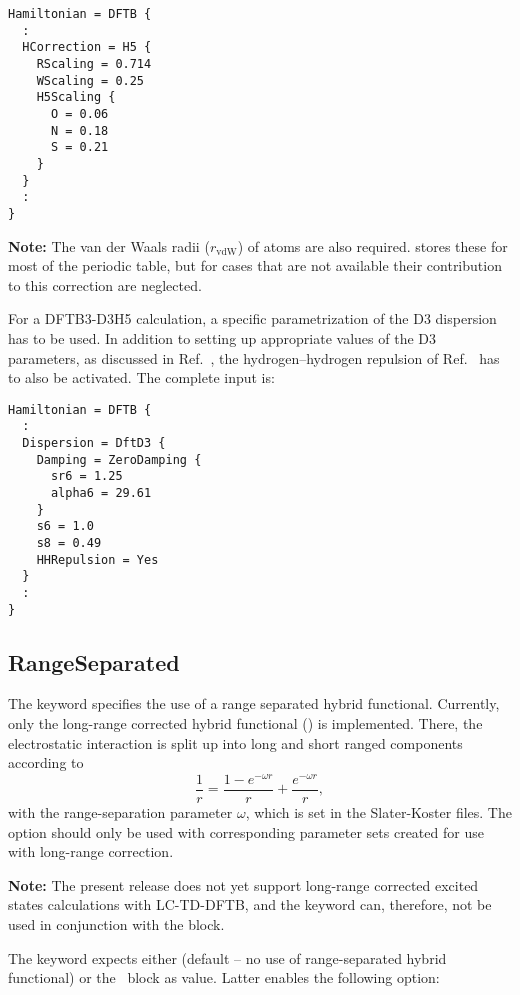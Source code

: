 \begin{verbatim}
Hamiltonian = DFTB {
  :
  HCorrection = H5 {
    RScaling = 0.714
    WScaling = 0.25
    H5Scaling {
      O = 0.06
      N = 0.18
      S = 0.21
    }
  }
  :
}
\end{verbatim}

\textbf{Note:} \label{page:dftbp.H5} The van der Waals radii ($r_\text{vdW}$) of
atoms are also required. \dftbp{} stores these for most of the periodic table,
but for cases that are not available their contribution to this correction are
neglected.

For a DFTB3-D3H5 calculation, a specific parametrization of the D3 dispersion
has to be used. In addition to setting up appropriate values of the D3
parameters, as discussed in Ref.~\cite{rezac-jctc-13-2017}, the
hydrogen--hydrogen repulsion of Ref.~\cite{rezac-jctc-8-2012} has to also be
activated. The complete input is:
\begin{verbatim}
Hamiltonian = DFTB {
  :
  Dispersion = DftD3 {
    Damping = ZeroDamping {
      sr6 = 1.25
      alpha6 = 29.61
    }
    s6 = 1.0
    s8 = 0.49
    HHRepulsion = Yes
  }
  :
}
\end{verbatim}

\subsection{RangeSeparated}
\label{sec:dftbp.RangeSep}

The  keyword specifies the use of a range separated hybrid
functional. Currently, only the long-range corrected hybrid functional ()
\cite{niehaus-PSSB-249-237,lutsker-JCP-143-184107} is implemented. There, the
electrostatic interaction is split up into long and short ranged components
according to
\begin{equation*}
\frac{1}{r}=\frac{1-e^{-\omega r}}{r}+\frac{e^{-\omega r}}{r},
\end{equation*}
with the range-separation parameter $\omega$, which is set in the Slater-Koster
files. The option should only be used with corresponding parameter sets created
for use with long-range correction.

\textbf{Note:} The present release does not yet support long-range
corrected excited states calculations with LC-TD-DFTB, and the
 keyword can, therefore, not be used in conjunction with the
 block.

The  keyword expects either  (default -- no use of
range-separated hybrid functional) or the \cb\  block as value. Latter
enables the following option:

